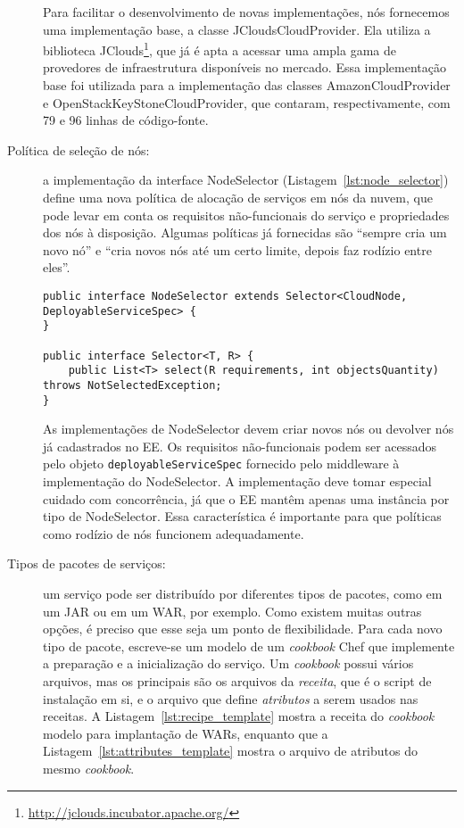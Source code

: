 \begin{description}
Para facilitar o desenvolvimento de novas implementações,
nós fornecemos uma implementação base, a classe \textsf{JCloudsCloudProvider}.
Ela utiliza a biblioteca JClouds\footnote{\url{http://jclouds.incubator.apache.org/}},
que já é apta a acessar uma ampla gama de provedores de infraestrutura disponíveis no mercado.
Essa implementação base foi utilizada para a implementação das classes 
\textsf{AmazonCloudProvider} e \textsf{OpenStackKeyStoneCloudProvider},
que contaram, respectivamente, com 79 e 96 linhas de código-fonte.


\item [Política de seleção de nós:] a implementação da interface \textsf{NodeSelector} (Listagem~\ref{lst:node_selector})
define uma nova política de alocação de serviços em nós da nuvem, que pode levar em conta os requisitos não-funcionais do serviço e 
propriedades dos nós à disposição.
Algumas políticas já fornecidas são ``sempre cria um novo nó'' e 
``cria novos nós até um certo limite, depois faz rodízio entre eles''.

\begin{lstlisting}[frame=trbl, label=lst:node_selector, caption=Interface NodeSelector acompanhada de sua classe pai Selector.]
public interface NodeSelector extends Selector<CloudNode, DeployableServiceSpec> {
}

public interface Selector<T, R> {
    public List<T> select(R requirements, int objectsQuantity) throws NotSelectedException;
}
\end{lstlisting}

As implementações de \textsf{NodeSelector} devem criar novos nós ou devolver nós já cadastrados no EE.
Os requisitos não-funcionais podem ser acessados pelo objeto \texttt{deployableServiceSpec} fornecido pelo
middleware à implementação do \textsf{NodeSelector}.
A implementação deve tomar especial cuidado com concorrência, já que o EE mantêm apenas uma instância
por tipo de \textsf{NodeSelector}. Essa característica é importante para que políticas como
rodízio de nós funcionem adequadamente.


\item [Tipos de pacotes de serviços:] um serviço pode ser distribuído por diferentes tipos de pacotes, como em um JAR ou em um WAR, por 
exemplo. Como existem muitas outras opções, é preciso que esse seja um ponto de flexibilidade. Para cada novo tipo de pacote, escreve-se 
um modelo de um \emph{cookbook} Chef que implemente a preparação e a inicialização do serviço. Um \emph{cookbook} possui vários 
arquivos, mas os principais são os arquivos da \emph{receita}, que é o script de instalação em si, e o arquivo que define \emph
{atributos} a serem usados nas receitas. A Listagem~\ref{lst:recipe_template} mostra a receita do \emph{cookbook} modelo
para implantação de WARs, enquanto que a Listagem~\ref{lst:attributes_template} mostra o arquivo de atributos do mesmo \emph{cookbook}.


\end{description}
